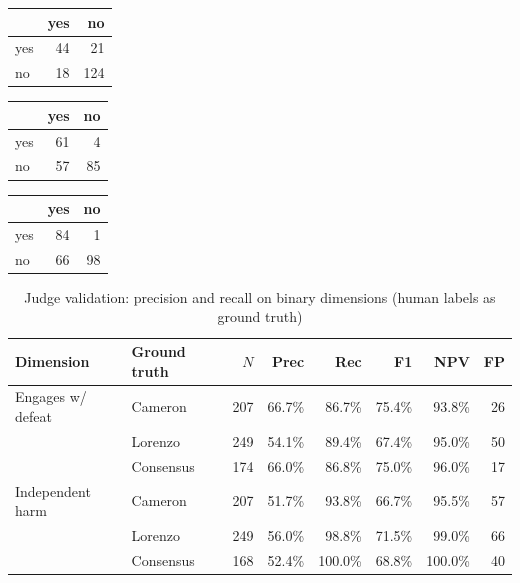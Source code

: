 \begin{tabular}{lrr}
\toprule
 & yes & no \\
\midrule
yes & 44 & 21 \\
no & 18 & 124 \\
\bottomrule
\end{tabular}

\begin{tabular}{lrr}
\toprule
 & yes & no \\
\midrule
yes & 61 & 4 \\
no & 57 & 85 \\
\bottomrule
\end{tabular}

\begin{tabular}{lrr}
\toprule
 & yes & no \\
\midrule
yes & 84 & 1 \\
no & 66 & 98 \\
\bottomrule
\end{tabular}

\begin{table}[ht]
\centering
\caption{Judge validation: precision and recall on binary dimensions (human labels as ground truth)}
\label{tab:judge-pr}
\begin{tabular}{llrrrrrr}
\toprule
Dimension & Ground truth & $N$ & Prec & Rec & F1 & NPV & FP \\
\midrule
Engages w/ defeat & Cameron & 207 & 66.7\% & 86.7\% & 75.4\% & 93.8\% & 26 \\
 & Lorenzo & 249 & 54.1\% & 89.4\% & 67.4\% & 95.0\% & 50 \\
 & Consensus & 174 & 66.0\% & 86.8\% & 75.0\% & 96.0\% & 17 \\
\midrule
Independent harm & Cameron & 207 & 51.7\% & 93.8\% & 66.7\% & 95.5\% & 57 \\
 & Lorenzo & 249 & 56.0\% & 98.8\% & 71.5\% & 99.0\% & 66 \\
 & Consensus & 168 & 52.4\% & 100.0\% & 68.8\% & 100.0\% & 40 \\
\bottomrule
\end{tabular}
\end{table}

